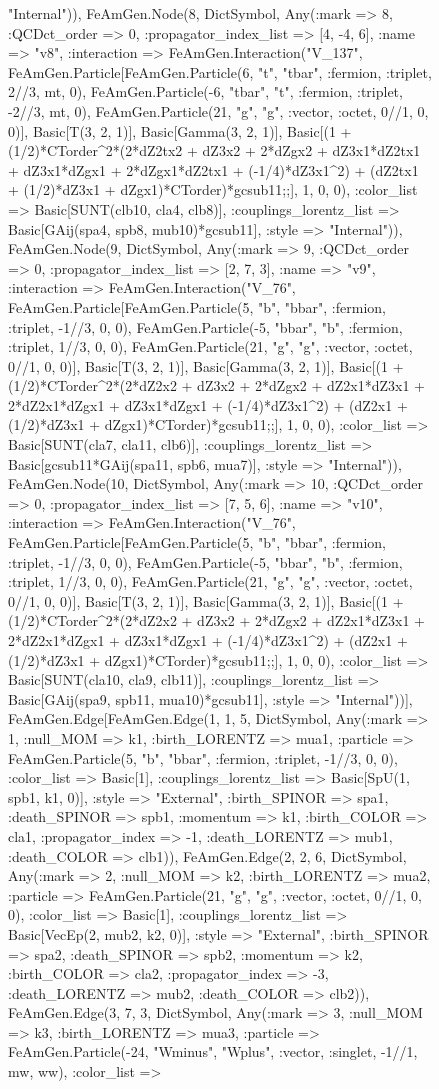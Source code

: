 \documentclass{revtex4}
\begin{document}
\begin{figure}[!htb]
\begin{center}
{"Internal")), FeAmGen.Node(8, Dict{Symbol, Any}(:mark => 8, :QCDct_order => 0, :propagator_index_list => [4, -4, 6], :name => "v8", :interaction => FeAmGen.Interaction("V_137", FeAmGen.Particle[FeAmGen.Particle(6, "t", "tbar", :fermion, :triplet, 2//3, mt, 0), FeAmGen.Particle(-6, "tbar", "t", :fermion, :triplet, -2//3, mt, 0), FeAmGen.Particle(21, "g", "g", :vector, :octet, 0//1, 0, 0)], Basic[T(3, 2, 1)], Basic[Gamma(3, 2, 1)], Basic[(1 + (1/2)*CTorder^2*(2*dZ2tx2 + dZ3x2 + 2*dZgx2 + dZ3x1*dZ2tx1 + dZ3x1*dZgx1 + 2*dZgx1*dZ2tx1 + (-1/4)*dZ3x1^2) + (dZ2tx1 + (1/2)*dZ3x1 + dZgx1)*CTorder)*gcsub11;;], 1, 0, 0), :color_list => Basic[SUNT(clb10, cla4, clb8)], :couplings_lorentz_list => Basic[GAij(spa4, spb8, mub10)*gcsub11], :style => "Internal")), FeAmGen.Node(9, Dict{Symbol, Any}(:mark => 9, :QCDct_order => 0, :propagator_index_list => [2, 7, 3], :name => "v9", :interaction => FeAmGen.Interaction("V_76", FeAmGen.Particle[FeAmGen.Particle(5, "b", "bbar", :fermion, :triplet, -1//3, 0, 0), FeAmGen.Particle(-5, "bbar", "b", :fermion, :triplet, 1//3, 0, 0), FeAmGen.Particle(21, "g", "g", :vector, :octet, 0//1, 0, 0)], Basic[T(3, 2, 1)], Basic[Gamma(3, 2, 1)], Basic[(1 + (1/2)*CTorder^2*(2*dZ2x2 + dZ3x2 + 2*dZgx2 + dZ2x1*dZ3x1 + 2*dZ2x1*dZgx1 + dZ3x1*dZgx1 + (-1/4)*dZ3x1^2) + (dZ2x1 + (1/2)*dZ3x1 + dZgx1)*CTorder)*gcsub11;;], 1, 0, 0), :color_list => Basic[SUNT(cla7, cla11, clb6)], :couplings_lorentz_list => Basic[gcsub11*GAij(spa11, spb6, mua7)], :style => "Internal")), FeAmGen.Node(10, Dict{Symbol, Any}(:mark => 10, :QCDct_order => 0, :propagator_index_list => [7, 5, 6], :name => "v10", :interaction => FeAmGen.Interaction("V_76", FeAmGen.Particle[FeAmGen.Particle(5, "b", "bbar", :fermion, :triplet, -1//3, 0, 0), FeAmGen.Particle(-5, "bbar", "b", :fermion, :triplet, 1//3, 0, 0), FeAmGen.Particle(21, "g", "g", :vector, :octet, 0//1, 0, 0)], Basic[T(3, 2, 1)], Basic[Gamma(3, 2, 1)], Basic[(1 + (1/2)*CTorder^2*(2*dZ2x2 + dZ3x2 + 2*dZgx2 + dZ2x1*dZ3x1 + 2*dZ2x1*dZgx1 + dZ3x1*dZgx1 + (-1/4)*dZ3x1^2) + (dZ2x1 + (1/2)*dZ3x1 + dZgx1)*CTorder)*gcsub11;;], 1, 0, 0), :color_list => Basic[SUNT(cla10, cla9, clb11)], :couplings_lorentz_list => Basic[GAij(spa9, spb11, mua10)*gcsub11], :style => "Internal"))], FeAmGen.Edge[FeAmGen.Edge(1, 1, 5, Dict{Symbol, Any}(:mark => 1, :null_MOM => k1, :birth_LORENTZ => mua1, :particle => FeAmGen.Particle(5, "b", "bbar", :fermion, :triplet, -1//3, 0, 0), :color_list => Basic[1], :couplings_lorentz_list => Basic[SpU(1, spb1, k1, 0)], :style => "External", :birth_SPINOR => spa1, :death_SPINOR => spb1, :momentum => k1, :birth_COLOR => cla1, :propagator_index => -1, :death_LORENTZ => mub1, :death_COLOR => clb1)), FeAmGen.Edge(2, 2, 6, Dict{Symbol, Any}(:mark => 2, :null_MOM => k2, :birth_LORENTZ => mua2, :particle => FeAmGen.Particle(21, "g", "g", :vector, :octet, 0//1, 0, 0), :color_list => Basic[1], :couplings_lorentz_list => Basic[VecEp(2, mub2, k2, 0)], :style => "External", :birth_SPINOR => spa2, :death_SPINOR => spb2, :momentum => k2, :birth_COLOR => cla2, :propagator_index => -3, :death_LORENTZ => mub2, :death_COLOR => clb2)), FeAmGen.Edge(3, 7, 3, Dict{Symbol, Any}(:mark => 3, :null_MOM => k3, :birth_LORENTZ => mua3, :particle => FeAmGen.Particle(-24, "Wminus", "Wplus", :vector, :singlet, -1//1, mw, ww), :color_list => }
\end{center}
\end{figure}
\end{document}

